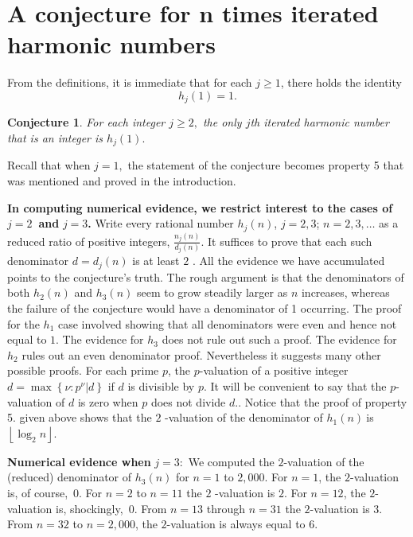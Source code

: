 \documentclass{article}
\theoremstyle{theorem}
\newtheorem{conjecture}[theorem]{Conjecture}
\theoremstyle{definition}
\begin{document}
\section{A conjecture for n times iterated harmonic numbers}

From the definitions, it is immediate that for each $j\geq 1$, there holds
the identity 
\begin{equation*}
h_{j}\left( 1\right) =1.
\end{equation*}

\begin{conjecture}
For each integer $j\geq 2,$ the only $j$th iterated harmonic number that is
an integer is $h_{j}\left( 1\right) .$
\end{conjecture}

Recall that when $j=1,$ the statement of the conjecture becomes property 5
that was mentioned and proved in the introduction.

\textbf{In computing numerical evidence, we restrict interest to the cases
of }$j=2$\textbf{\ and }$j=3$\textbf{.} Write every rational number $%
h_{j}\left( n\right) $, $j=2,3$; $n=2,3,\dots $ as a reduced ratio of positive
integers, $\frac{n_{j}\left( n\right) }{d_{j}\left( n\right) }.$ It suffices
to prove that each such denominator $d=d_{j}\left( n\right) $ is at least $2$%
. All the evidence we have accumulated points to the conjecture's truth. The
rough argument is that the denominators of both $h_{2}\left( n\right) $ and $%
h_{3}\left( n\right) $ seem to grow steadily larger as $n$ increases,
whereas the failure of the conjecture would have a denominator of 1
occurring. The proof for the $h_{1}$ case involved showing that all
denominators were even and hence not equal to $1$. The evidence for $h_{3}$
does not rule out such a proof. The evidence for $h_{2}$ rules out an even
denominator proof. Nevertheless it suggests many other possible proofs. For
each prime $p$, the $p$-valuation of a positive integer $d=\max \left\{ \nu
:p^{\nu }|d\right\} $ if $d$ is divisible by $p.$ It will be convenient to
say that the $p$-valuation of $d$ is zero when $p$ does not divide $d.$.
Notice that the proof of property 5. given above shows that the $2$%
-valuation of the denominator of $h_{1}\left( n\right) \ $is $\left\lfloor
\log _{2}n\right\rfloor $.

\bigskip

\textbf{Numerical evidence when }$j=3:$ We computed the $2$-valuation of the
(reduced) denominator of $h_{3}\left( n\right) $ for $n=1$ to $2,000$. For $%
n=1$, the $2$-valuation is, of course,~$0$. For $n=2$ to $n=11$ the $2$%
-valuation is $2$. For $n=12$, the $2$-valuation is, shockingly,~$0$. From $%
n=13$ through $n=31$ the $2$-valuation is $3$. From $n=32$ to $n=2,000$, the 
$2$-valuation is always equal to $6$.
\end{document}

